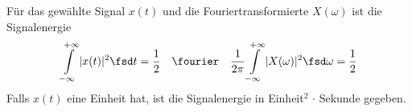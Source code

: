 \begin{Loesung}
Für das gewählte Signal $x(t)$ und die Fouriertransformierte $X(\omega)$ ist die
Signalenergie
\begin{equation}
  \int\limits_{-\infty}^{+\infty} |x(t)|^2 \fsd t
  =\frac{1}{2}\quad\fourier\quad
  \frac{1}{2\pi}\int\limits_{-\infty}^{+\infty} |X(\omega)|^2 \fsd \omega=\frac{1}{2}
\end{equation}
Falls $x(t)$ eine Einheit hat, ist die Signalenergie in Einheit$^2$ $\cdot$ Sekunde
gegeben.
\end{Loesung}


